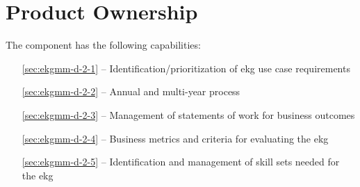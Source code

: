 \chapter{Product Ownership}\label{ch:ekgmm-d-2}

The  component has the following capabilities:

\begin{itemize}[leftmargin=.5in]
  \item [\ref{sec:ekgmm-d-2-1}]  -- Identification/prioritization of \gls{ekg} use case requirements
  \item [\ref{sec:ekgmm-d-2-2}]  -- Annual and multi-year  process
  \item [\ref{sec:ekgmm-d-2-3}]  -- Management of statements of work
  for business outcomes
  \item [\ref{sec:ekgmm-d-2-4}]  -- Business metrics and criteria for evaluating the \gls{ekg}
  \item [\ref{sec:ekgmm-d-2-5}]  -- Identification and management of skill sets
  needed for the \gls{ekg}
\end{itemize}






